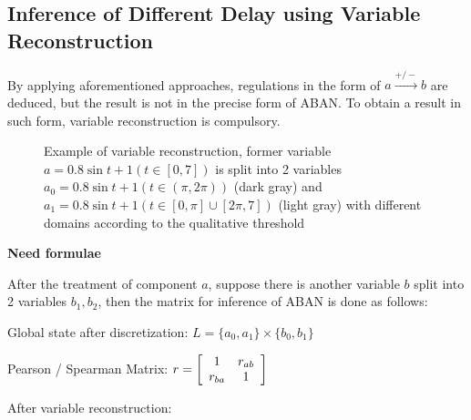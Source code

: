 \subsection{Inference of Different Delay using Variable Reconstruction}
By applying aforementioned approaches, regulations in the form of $a\xrightarrow{+/-}b$ are deduced, but the result is not in the precise form of ABAN. To obtain a result in such form, variable reconstruction is compulsory.

\begin{figure}[ht]
\centering
{}
\caption[Variable reconstruction]{Example of variable reconstruction, former variable $a=0.8\sin t+1(t\in [0,7])$ is split into 2 variables $a_0=0.8\sin t+1(t\in (\pi,2\pi))$ (dark gray) and $a_1=0.8\sin t+1(t\in [0,\pi]\cup[2\pi,7])$ (light gray) with different domains according to the qualitative threshold}\label{varRec}
\end{figure}

\textbf{Need formulae}

After the treatment of component $a$, suppose there is another variable $b$ split into 2 variables $b_1,b_2$, then the matrix for inference of ABAN is done as follows:

Global state after discretization: $L=\{a_0,a_1\}\times \{b_0,b_1\}\ $

Pearson / Spearman Matrix: $r=\left[
\begin{array}{*{20}c}
1 & r_{ab}\\
r_{ba} & 1 \\
\end{array}
\right]\ 
$

After variable reconstruction:

